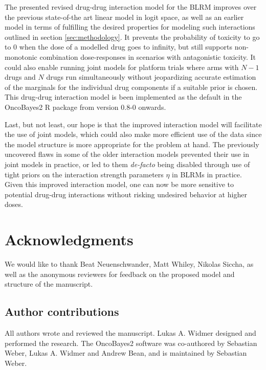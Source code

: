 \documentclass[AMA,STIX1COL]{WileyNJD-v2}
\newcommand{\revision}[1]{#1}
\begin{document}
\revision{The presented revised drug-drug interaction model for the BLRM improves over the previous state-of-the art linear model in logit space, as well as an earlier model\citep{Thall2003} in terms of fulfilling the desired properties for modeling such interactions outlined in section \ref{sec:methodology}.} It prevents the probability of toxicity to go to 0 when the dose of a modelled drug goes to infinity, but still supports non-monotonic combination dose-responses in scenarios with antagonistic toxicity. It could also enable running joint models for platform trials where arms with $N - 1$ drugs and $N$ drugs run simultaneously without jeopardizing accurate estimation of the marginals for the individual drug components if a suitable prior is chosen. This drug-drug interaction model is been implemented as the default in the OncoBayes2 R package from version 0.8-0 onwards.

Last, but not least, our hope is that the improved interaction model will facilitate the use of joint models, which could also make more efficient use of the data since the model structure is more appropriate for the problem at hand. The previously uncovered flaws in some of the older interaction models prevented their use in joint models in practice, or led to them \emph{de-facto} being disabled through use of tight priors on the interaction strength parameters $\eta$ \revision{in BLRMs} in practice. Given this improved interaction model, one can now be more sensitive to potential drug-drug interactions without risking undesired behavior at higher doses.




\section*{Acknowledgments}
We would like to thank Beat Neuenschwander, Matt Whiley\revision{, Nikolas Siccha, as well as the anonymous reviewers} for feedback on the proposed model and structure of the manuscript.

\subsection*{Author contributions}
All authors wrote and reviewed the manuscript. Lukas A. Widmer designed and performed the research. The OncoBayes2 software was co-authored by Sebastian Weber, Lukas A. Widmer and Andrew Bean, and is maintained by Sebastian Weber.
\end{document}
